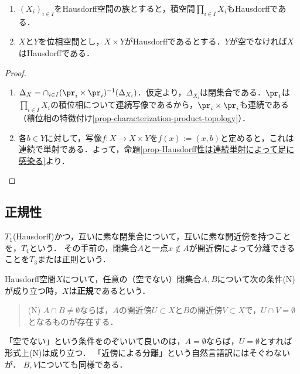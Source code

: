 \documentclass[uplatex,dvipdfmx]{jsreport}
\begin{document}
\begin{proposition}[直積へのHausdorff性の伝播]\mbox{}
    \begin{enumerate}
        \item $(X_i)_{i\in I}$をHausdorff空間の族とすると，積空間$\prod_{i\in I}X_i$もHausdorffである．
        \item $X$と$Y$を位相空間とし，$X\times Y$がHausdorffであるとする．$Y$が空でなければ$X$はHausdorffである．
    \end{enumerate}
\end{proposition}
\begin{proof}\mbox{}
    \begin{enumerate}
        \item $\Delta_X=\cap_{i\in I}(\pr_i\times\pr_i)^{-1}(\Delta_{X_i})$．仮定より，$\Delta_{X_i}$は閉集合である．$\pr_i$は$\prod_{i\in I}X_i$の積位相について連続写像であるから，$\pr_i\times\pr_i$も連続である（積位相の特徴付け\ref{prop-characterization-product-topology}）．
        \item 各$b\in Y$に対して，写像$f:X\to X\times Y$を$f(x):=(x,b)$と定めると，これは連続で単射である．よって，命題\ref{prop-Hausdorff性は連続単射によって足に感染る}より．
    \end{enumerate}
\end{proof}

\subsection{正規性}

\begin{tcolorbox}[colframe=ForestGreen, colback=ForestGreen!10!white, breakable ,colbacktitle=ForestGreen!40!white, coltitle=black,fonttitle=\bfseries\sffamily
    ,title=$T_4$]
    $T_1$(Hausdorff)かつ，互いに素な閉集合について，互いに素な開近傍を持つことを，$T_4$という．
    その手前の，閉集合$A$と一点$x\notin A$が開近傍によって分離できることを$T_3$または正則という．
\end{tcolorbox}

\begin{definition}[normal]\label{def-normal}
    Hausdorff空間$X$について，任意の（空でない）閉集合$A,B$について次の条件(N)が成り立つ時，$X$は\textbf{正規}であるという．
    \begin{quote}
        (N) $A\cap B\ne\emptyset$ならば，$A$の開近傍$U\subset X$と$B$の開近傍$V\subset X$で，$U\cap V=\emptyset$となるものが存在する．
    \end{quote}
\end{definition}
\begin{remark}
    「空でない」という条件をのぞいいて良いのは，$A=\emptyset$ならば，$U=\emptyset$とすれば形式上(N)は成り立つ．
    「近傍による分離」という自然言語訳にはそぐわないが．
    $B,V$についても同様である．
\end{remark}
\end{document}
